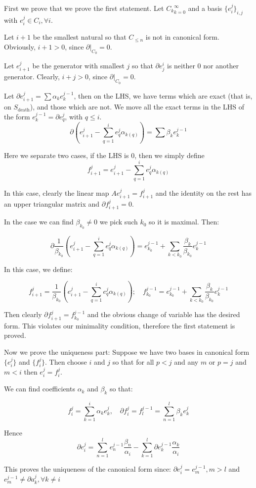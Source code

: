 \begin{prof}
First we prove that we prove the first statement. 
Let ${C_k}_{k=0}^\infty$ 
and a basis $\{e_i^j\}_{i,j}$ 
with $e_i^j\in C_i,\forall i$.

Let $i+1$ be the smallest natural so that $C_{\leq n}$
is not in canonical form. Obviously, $i+1>0$, since $\partial | _{C_0}=0$.

Let $e_{i+1}^j$ be the generator with smallest $j$ so that $\partial e^i_j$
is neither 0 nor another generator. Clearly, $i+j>0$, since $\partial | _{C_0}=0$.

Let $\partial e_{i+1}^j=\sum \alpha_k e_k^{j-1}$, then on the LHS, we have terms which are exact (that is, on $S_{\text{death}}$),
and those which are not. We move all the exact terms in the LHS of the form $e_{k}^{j-1}=\partial e_{q}^j$, with $q\leq i$.
$$
\partial\left(
e_{i+1}^j
-
\sum_{q=1}^i
e^j_q\alpha_{k(q)}
\right)
=
\sum \beta_k e_k^{j-1}
$$

Here we separate two cases,
if the LHS is $0$, then we simply define 
$$
f^j_{i+1}=
e_{i+1}^j
-
\sum_{q=1}^i
e^j_q\alpha_{k(q)}
$$

In this case, clearly the linear map $A e_{i+1}^j=f_{i+1}^j$ and the identity on the rest 
has an upper triangular matrix and $\partial f^j_{i+1}=0$.

In the case we can find $\beta_{k_0}\neq 0 $ we pick such $k_0$ so it is maximal. Then:

$$
\partial
\frac{1}{\beta_{k_0}}
\left(
e_{i+1}^j
-
\sum_{q=1}^i
e^j_q\alpha_{k(q)}
\right)
=
e_{k_0}^{j-1}
+
\sum_{k<k_0} \frac{\beta_k}{\beta_{k_0}} e_k^{j-1}
$$

In this case, we define:

$$
f_{i+1}^j
=
\frac{1}{\beta_{k_0}}
\left(
e_{i+1}^j
-
\sum_{q=1}^i
e^j_q\alpha_{k(q)}
\right);
\quad
f_{k_{0}}^{j-1}
=
e_{k_0}^{j-1}
+
\sum_{k<k_0} \frac{\beta_k}{\beta_{k_0}} e_k^{j-1}
$$

Then clearly $\partial f^j_{i+1}=f_{k_0}^{j-1}$ and the obvious change of variable has the desired form.
This violates our minimality condition, therefore the first statement is proved.

Now we prove the uniqueness part: Suppose we have two bases in canonical form
$\{e_i^j\}$ and $\{f_i^j\}$. Then choose $i$ and $j$ so that for all $p<j$ and any $m$
or $p=j$ and $m<i$ then $e_i^j=f_i^j$. 

We can find coefficients $\alpha_k$ and $\beta_k$ so that:

$$
f_i^j
=
\sum_{k=1}^i \alpha_k e_k^j,
\quad
\partial f_i^j = f_l^{j-1}
=
\sum_{n=1}^l \beta_k e_k^j
$$

Hence 
$$
\partial e_i^j=
\sum_{n=1}^l
e_n^{j-1}\frac{\beta_n}{\alpha_i}
-
\sum_{k=1}^l
\partial e_k^{j-1}\frac{\alpha_k}{\alpha_i}
$$

This proves the uniqueness of the canonical form since: $\partial e_i^j=e_m^{j-1},m>l$ and 
$e_m^{j-1}\neq \partial a_k^j, \forall k\neq i$
 
\end{prof}

